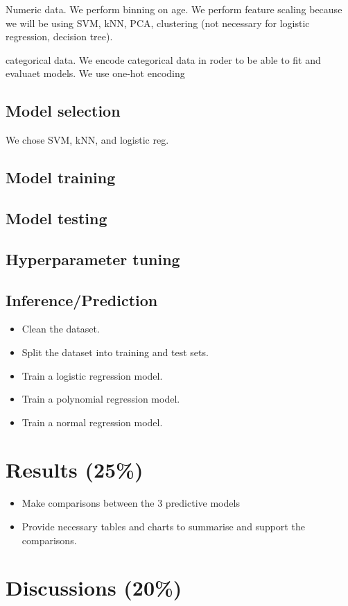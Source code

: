 \documentclass[twoside,11pt]{article}
\begin{document}
Numeric data. We perform binning on age. We perform feature scaling because we will be using SVM, kNN, PCA, clustering (not necessary for logistic regression, decision tree). 

categorical data. We encode categorical data in roder to be able to fit and evaluaet models. We use one-hot encoding

\subsection{Model selection}
We chose SVM, kNN, and logistic reg.

\subsection{Model training}
\subsection{Model testing}
\subsection{Hyperparameter tuning}
\subsection{Inference/Prediction}
\begin{itemize}
    \item Clean the dataset.
    \item Split the dataset into training and test sets.
    \item Train a logistic regression model.
    \item Train a polynomial regression model.
    \item Train a normal regression model.
\end{itemize}

\section{Results (25\%)}
\begin{itemize}
    \item Make comparisons between the 3 predictive models
    \item Provide necessary tables and charts to summarise and support the comparisons.
\end{itemize}

\section{Discussions (20\%)}
\end{document}
